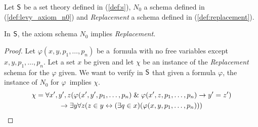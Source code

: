 Let $\sf{S}$ be a set theory defined in (\ref{def:s}), $N_0$ a schema defined in (\ref{def:levy_axiom_n0}) and \emph{Replacement} a schema defined in (\ref{def:replacement}).
\begin{theorem} 
In $\sf{S}$, the axiom schema $N_0$ implies \emph{Replacement}.
\end{theorem}
\begin{proof}
Let $\varphi(x, y, p_1, \ldots, p_n)$ be a~formula with no free variables except $x, y, p_1, \ldots, p_n$.
Let a set $x$ be given and let $\chi$ be an instance of the \emph{Replacement} schema for the $\varphi$ given.
We want to verify in $\sf{S}$ that given a formula $\varphi$, the instance of $N_0$ for $\varphi$ implies $\chi$.
\begin{equation}
\begin{gathered}
\chi = \forall x', y', z(\varphi(x', y', p_1, \ldots, p_n) \mathrel{\&} \varphi(x', z, p_1, \ldots, p_n) \rightarrow y' = z') \\
\rightarrow \exists y \forall z (z \in y \leftrightarrow (\exists q \in x)(\varphi(x, y, p_1, \ldots, p_n)))
\end{gathered}
\end{equation}


\end{proof}
